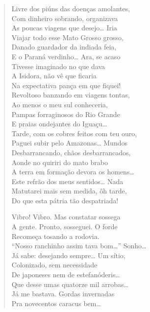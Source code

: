 \begin{verse}
Livre dos piúns das doenças amolantes,\\
Com dinheiro sobrando, organizava\\
As poucas viagens que desejo\ldots{} Iria\\
Viajar todo esse Mato Grosso grosso,\\
Danado guardador da indiada feia,\\
E o Paraná verdinho\ldots{} Ara, se acaso\\
Tivesse imaginado no que dava\\
A Isidora, não vê que ficaria\\
Na expectativa pança em que fiquei!\\
Revoltoso banzando em viagens tontas,\\
Ao menos o meu sul conheceria,\\
Pampas forraginosos do Rio Grande\\
E praias ondejantes do Iguaçu\ldots{}\\
Tarde, com os cobres feitos com teu ouro,\\
Paguei subir pelo Amazonas\ldots{} Mundos\\
Desbarrancando, chãos desbarrancados,\\
Aonde no quiriri do mato brabo\\
A terra em formação devora os homens\ldots{}\\
Este refrão dos meus sentidos\ldots{} Nada\\
Matutarei mais sem medida, ôh tarde,\\
Do que esta pátria tão despatriada!

Vibro! Vibro. Mas constatar sossega\\
A gente. Pronto, sosseguei. O forde\\
Recomeça tosando a rodovia.\\
``Nosso ranchinho assim tava bom\ldots{}'' Sonho\ldots{}\\
Já sabe: desejando sempre\ldots{} Um sítio,\\
Colonizado, sem necessidade\\
De japoneses nem de estefanóderis\ldots{}\\
Que desse umas quatorze mil arrobas\ldots{}\\
Já me bastava. Gordas invernadas\\
Pra novecentos caracus bem\ldots{}


\end{verse}
